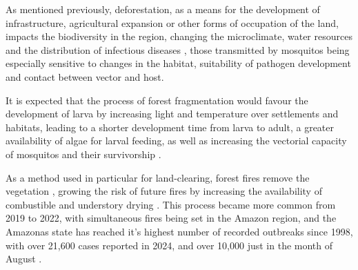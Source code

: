 \documentclass[a4paper,fleqn]{cas-dc}
\begin{document}
As mentioned previously, deforestation, as a means for the development of infrastructure, agricultural expansion or other forms of occupation of the land, impacts the biodiversity in the region, changing the microclimate, water resources and the distribution of infectious diseases \cite{Reconstructing_Three_Decades, Amazon_Defor_Drives_Malaria_Transmis}, those transmitted by mosquitos being especially sensitive to changes in the habitat, suitability of pathogen development and contact between vector and host.

It is expected that the process of forest fragmentation would favour the development of larva by increasing light and temperature over settlements and habitats, leading to a shorter development time from larva to adult, a greater availability of algae for larval feeding, as well as increasing the vectorial capacity of mosquitos and their survivorship \cite{Alteracoes_Ambientais, Anthropogenic_Landscape}.

As a method used in particular for land-clearing, forest fires remove the vegetation \cite{Future_of_Deforestation, Relationship_between_fires_and_defor}, growing the risk of future fires by increasing the availability of combustible and understory drying \cite{Conservation_Policy}. This process became more common from 2019 to 2022, with simultaneous fires being set in the Amazon region, and the Amazonas state has reached it's highest number of recorded outbreaks since 1998, with over 21,600 cases reported in 2024, and over 10,000 just in the month of August \cite{Threats_and_Opportunities, G1_Queimadas}.
\end{document}
